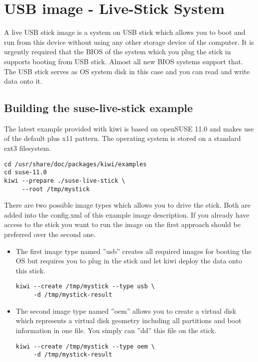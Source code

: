 \chapter{USB image - Live-Stick System}
\label{chapter:usb}
\minitoc

A live USB stick image is a system on USB stick which allows you to
boot and run from this device without using any other storage device of
the computer. It is urgently required that the BIOS of the system which
you plug the stick in supports booting from USB stick. Almost all
new BIOS systems support that. The USB stick serves as OS system disk
in this case and you can read and write data onto it.

\section{Building the suse-live-stick example}

The latest example provided with kiwi is based on openSUSE 11.0 and makes use
of the default plus x11 pattern. The operating system is stored on a
standard ext3 filesystem. 

\begin{Command}{12cm}
\begin{verbatim}
cd /usr/share/doc/packages/kiwi/examples
cd suse-11.0
kiwi --prepare ./suse-live-stick \
     --root /tmp/mystick
\end{verbatim}
\end{Command}

There are two possible image types which allows you to drive the
stick. Both are added into the config.xml of this example image
description. If you already have access to the stick you want to
run the image on the first approach should be preferred over the
second one.

\begin{itemize}
\item The first image type named ''usb'' creates all required
      images for booting the OS but requires you to plug in the stick
      and let kiwi deploy the data onto this stick.

      \begin{Command}{12cm}
      \begin{verbatim}
kiwi --create /tmp/mystick --type usb \
     -d /tmp/mystick-result
      \end{verbatim}
      \end{Command}

\item The second image type named ''oem'' allows you to create a
      virtual disk which represents a virtual disk geometry including
      all partitions and boot information in one file. You simply can ''dd''
      this file on the stick.

      \begin{Command}{12cm}
      \begin{verbatim}
kiwi --create /tmp/mystick --type oem \
     -d /tmp/mystick-result
      \end{verbatim}
      \end{Command}
\end{itemize}


